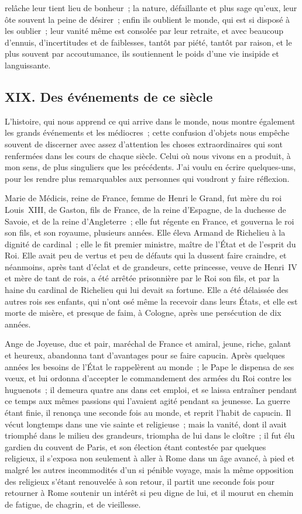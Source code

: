 \documentclass[french,twoside]{book} %
\begin{document}
relâche leur tient lieu de bonheur ; la nature, défaillante et plus sage qu’eux, leur ôte souvent la peine de désirer ; enfin ils oublient le monde, qui est si disposé à les oublier ; leur vanité même est consolée par leur retraite, et avec beaucoup d’ennuis, d’incertitudes et de faiblesses, tantôt par piété, tantôt par raison, et le plus souvent par accoutumance, ils soutiennent le poids d’une vie insipide et languissante.
\subsection[{XIX. Des événements de ce siècle}]{XIX. Des événements de ce siècle}
\noindent L’histoire, qui nous apprend ce qui arrive dans le monde, nous montre également les grands événements et les médiocres ; cette confusion d’objets nous empêche souvent de discerner avec assez d’attention les choses extraordinaires qui sont renfermées dans les cours de chaque siècle. Celui où nous vivons en a produit, à mon sens, de plus singuliers que les précédents. J’ai voulu en écrire quelques-uns, pour les rendre plus remarquables aux personnes qui voudront y faire réflexion.\par
Marie de Médicis, reine de France, femme de Henri le Grand, fut mère du roi Louis XIII, de Gaston, fils de France, de la reine d’Espagne, de la duchesse de Savoie, et de la reine d’Angleterre ; elle fut régente en France, et gouverna le roi son fils, et son royaume, plusieurs années. Elle éleva Armand de Richelieu à la dignité de cardinal ; elle le fit premier ministre, maître de l’État et de l’esprit du Roi. Elle avait peu de vertus et peu de défauts qui la dussent faire craindre, et néanmoins, après tant d’éclat et de grandeurs, cette princesse, veuve de Henri IV et mère de tant de rois, a été arrêtée prisonnière par le Roi son fils, et par la haine du cardinal de Richelieu qui lui devait sa fortune. Elle a été délaissée des autres rois ses enfants, qui n’ont osé même la recevoir dans leurs États, et elle est morte de misère, et presque de faim, à Cologne, après une persécution de dix années.\par
Ange de Joyeuse, duc et pair, maréchal de France et amiral, jeune, riche, galant et heureux, abandonna tant d’avantages pour se faire capucin. Après quelques années les besoins de l’État le rappelèrent au monde ; le Pape le dispensa de ses vœux, et lui ordonna d’accepter le commandement des armées du Roi contre les huguenots ; il demeura quatre ans dans cet emploi, et se laissa entraîner pendant ce temps aux mêmes passions qui l’avaient agité pendant sa jeunesse. La guerre étant finie, il renonça une seconde fois au monde, et reprit l’habit de capucin. Il vécut longtemps dans une vie sainte et religieuse ; mais la vanité, dont il avait triomphé dans le milieu des grandeurs, triompha de lui dans le cloître ; il fut élu gardien du couvent de Paris, et son élection étant contestée par quelques religieux, il s’exposa non seulement à aller à Rome dans un âge avancé, à pied et malgré les autres incommodités d’un si pénible voyage, mais la même opposition des religieux s’étant renouvelée à son retour, il partit une seconde fois pour retourner à Rome soutenir un intérêt si peu digne de lui, et il mourut en chemin de fatigue, de chagrin, et de vieillesse.\par
\end{document}
